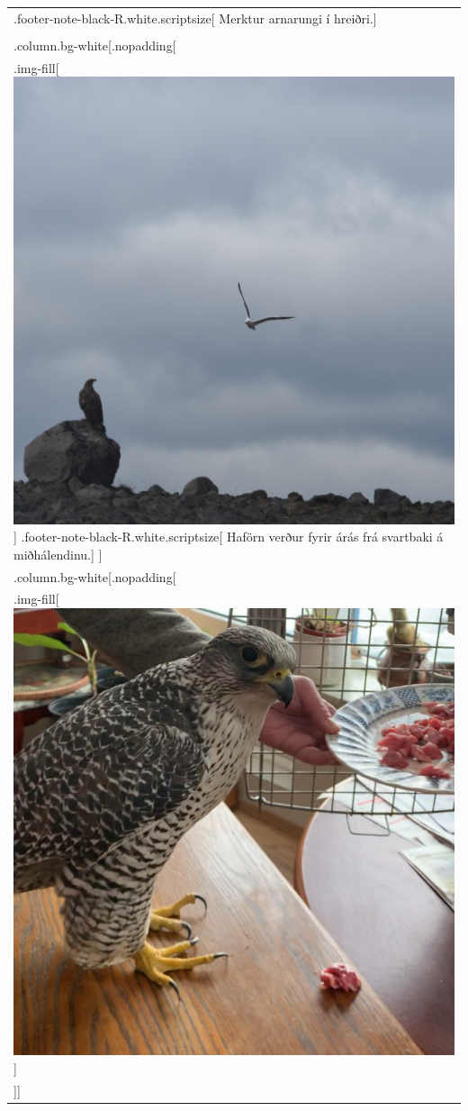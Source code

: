\documentclass[
]{article}
\begin{document}
\begin{longtable}[]{@{}
  >{\raggedright\arraybackslash}p{}@{}}
.footer-note-black-R.white.scriptsize{[} Merktur arnarungi í
hreiðri.{]} \\
{]}{]} \\
.column.bg-white{[}.nopadding{[} \\
.img-fill{[}\includegraphics{myndir/haforn.JPG}{]}
.footer-note-black-R.white.scriptsize{[} Haförn verður fyrir árás frá
svartbaki á miðhálendinu.{]} {]} \\
{]} .column.bg-white{[}.nopadding{[} \\
.img-fill{[}\includegraphics{myndir/falki.PNG}{]} \\
{]}{]} {]}{]} \\
\bottomrule
\end{longtable}
\end{document}
